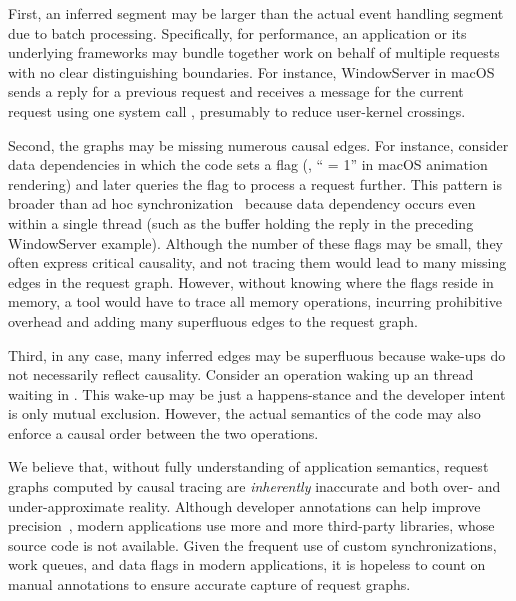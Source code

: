 First, an inferred segment may be larger than the actual event handling segment
due to batch processing. Specifically, for performance, an application or its
underlying frameworks may bundle together work on behalf of multiple requests
with no clear distinguishing boundaries. For instance, WindowServer in macOS
sends a reply for a previous request and receives a message for the current
request using one system call , presumably to
reduce user-kernel crossings.

Second, the graphs may be missing numerous causal edges. For instance, consider
data dependencies in which the code sets a flag (\eg, `` = 1''
in macOS animation rendering) and later queries the flag to process a request
further. This pattern is broader than ad hoc synchronization~\cite{xiong2010ad}
because data dependency occurs even within a single thread (such as the buffer
holding the reply in the preceding WindowServer example). Although the number of
these flags may be small, they often express critical causality, and not tracing
them would lead to many missing edges in the request graph. However, without
knowing where the flags reside in memory, a tool would have to trace all memory
operations, incurring prohibitive overhead and adding many superfluous edges to
the request graph.

Third, in any case, many inferred edges may be superfluous because wake-ups do
not necessarily reflect causality. Consider an  operation waking up
an thread waiting in . This wake-up may be just a happens-stance and
the developer intent is only mutual exclusion. However, the actual semantics of
the code may also enforce a causal order between the two operations.

We believe that, without fully understanding of application semantics, request
graphs computed by causal tracing are \emph{inherently} inaccurate and both
over- and under-approximate reality. Although developer annotations can help
improve precision~\cite{reynolds2006pip, fonseca2007x}, modern applications use
more and more third-party libraries, whose source code is not available. 
Given the frequent use of custom synchronizations, work queues, and data flags
in modern applications, it is hopeless to count on manual annotations to ensure
accurate capture of request graphs.

